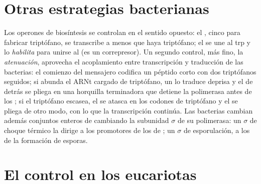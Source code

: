 \section{Otras estrategias bacterianas}

\begin{proposition}\label{prop:b1:expression-control:trp}
Los operones de biosíntesis se controlan en el sentido opuesto: el
\emph{}, cinco  para fabricar triptófano, se transcribe a
menos que haya triptófano; el  se une al  trp y lo
\emph{habilita} para unirse al  (es un correpresor). Un segundo
control, más fino, la \emph{atenuación}, aprovecha el acoplamiento entre
transcripción y traducción de las bacterias: el comienzo del mensajero
codifica un péptido corto con dos triptófanos seguidos; si abunda el ARNt
cargado de triptófano, un  lo traduce deprisa y el  de detrás se
pliega en una horquilla terminadora que detiene la polimerasa antes de los
; si el triptófano escasea, el  se atasca en los codones de
triptófano y el  se pliega de otro modo, con lo que la transcripción
continúa. Las bacterias cambian además conjuntos enteros de  cambiando
la subunidad $\sigma$ de su polimerasa: un $\sigma$ de choque térmico la
dirige a los promotores de los  de ; un $\sigma$ de
esporulación, a los de la formación de esporas.
\end{proposition}

\section{El control en los eucariotas}

